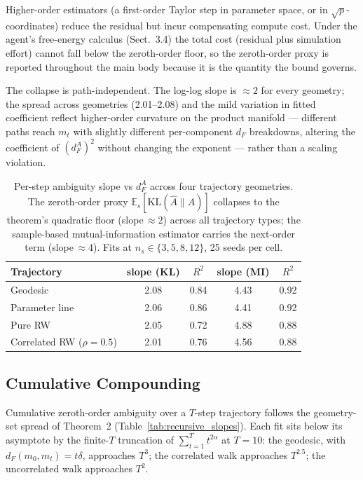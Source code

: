 \documentclass[runningheads]{llncs}
\begin{document}
Higher-order estimators (a first-order Taylor step in parameter space, or
in $\sqrt{p}$-coordinates) reduce the residual but incur compensating
compute cost. Under the agent's free-energy calculus
(Sect.~3.4) the total cost (residual plus
simulation effort) cannot fall below the zeroth-order floor, so the
zeroth-order proxy is reported throughout the main body because it is the
quantity the bound governs.
 
The collapse is path-independent. The log-log slope is $\approx 2$ for
every geometry; the spread across geometries (2.01--2.08) and the mild
variation in fitted coefficient reflect higher-order curvature on the
product manifold --- different paths reach $m_t$ with slightly different
per-component $d_F$ breakdowns, altering the coefficient of $(d_F^A)^2$
without changing the exponent --- rather than a scaling violation.
 
\begin{table}[t]
\centering
\caption{Per-step ambiguity slope vs $d_F^A$ across four trajectory
geometries. The zeroth-order proxy $\mathbb{E}_s[\mathrm{KL}(\hat A \| A)]$
collapses to the theorem's quadratic floor (slope$\,\approx\!2$) across
all trajectory types; the sample-based mutual-information estimator
carries the next-order term (slope$\,\approx\!4$). Fits at
$n_s \in \{3,5,8,12\}$, 25 seeds per cell.}
\label{tab:headline_slopes}
\begin{tabular}{lcccc}
\toprule
Trajectory & slope (KL) & $R^2$ & slope (MI) & $R^2$ \\
\midrule
Geodesic & 2.08 & 0.84 & 4.43 & 0.92 \\
Parameter line & 2.06 & 0.86 & 4.41 & 0.92 \\
Pure RW & 2.05 & 0.72 & 4.88 & 0.88 \\
Correlated RW ($\rho{=}0.5$) & 2.01 & 0.76 & 4.56 & 0.88 \\
\bottomrule
\end{tabular}
\end{table}
 
\subsection{Cumulative Compounding}\label{app:compounding}
 
Cumulative zeroth-order ambiguity over a $T$-step trajectory follows the
geometry-set spread of Theorem~2
(Table~\ref{tab:recursive_slopes}). Each fit sits below its asymptote by
the finite-$T$ truncation of $\sum_{t=1}^{T} t^{2\alpha}$ at $T = 10$:
the geodesic, with $d_F(m_0, m_t) = t\delta$, approaches $T^3$; the
correlated walk approaches $T^{2.5}$; the uncorrelated walk approaches
$T^2$.
 
\end{document}

